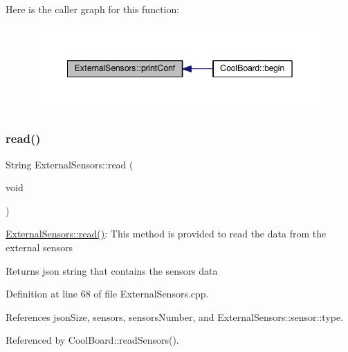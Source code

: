 Here is the caller graph for this function\+:\nopagebreak
\begin{figure}[H]
\begin{center}
\leavevmode
\includegraphics[width=342pt]{classExternalSensors_a78c2bf55084435dd51d3c559b2d3c6f3_icgraph}
\end{center}
\end{figure}
\mbox{\label{classExternalSensors_a53177b81eca3be89508b5511ddcd00fc}} 
\subsubsection{\texorpdfstring{read()}{read()}}
{\footnotesize\ttfamily String External\+Sensors\+::read (\begin{DoxyParamCaption}\item[{void}]{ }\end{DoxyParamCaption})}

\hyperlink{classExternalSensors_a53177b81eca3be89508b5511ddcd00fc}{External\+Sensors\+::read()}\+: This method is provided to read the data from the external sensors

\begin{DoxyReturn}{Returns}
json string that contains the sensors data 
\end{DoxyReturn}


Definition at line 68 of file External\+Sensors.\+cpp.



References json\+Size, sensors, sensors\+Number, and External\+Sensors\+::sensor\+::type.



Referenced by Cool\+Board\+::read\+Sensors().


